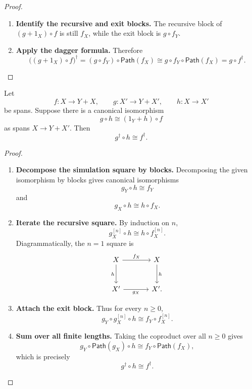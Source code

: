 \begin{proof}
\begin{enumerate}
  \item \textbf{Identify the recursive and exit blocks.}
  The recursive block of \((g+1_X)\circ f\) is still \(f_X\), while the exit
  block is \(g\circ f_Y\).

  \item \textbf{Apply the dagger formula.}
  Therefore
  \[
    \bigl((g+1_X)\circ f\bigr)^\dagger
    =
    (g\circ f_Y)\circ\mathsf{Path}(f_X)
    \cong
    g\circ f_Y\circ\mathsf{Path}(f_X)
    =
    g\circ f^\dagger.
  \]
\end{enumerate}
\end{proof}

\begin{theorem}[Uniformity]
\label{thm:conway-uniformity-feedback}
Let
\[
  f:X\to Y+X,
  \qquad
  g:X'\to Y+X',
  \qquad
  h:X\to X'
\]
be spans. Suppose there is a canonical isomorphism
\[
  g\circ h
  \cong
  (1_Y+h)\circ f
\]
as spans \(X\to Y+X'\). Then
\[
  g^\dagger\circ h
  \cong
  f^\dagger.
\]
\end{theorem}

\begin{proof}
\begin{enumerate}
  \item \textbf{Decompose the simulation square by blocks.}
  Decomposing the given isomorphism by blocks gives canonical isomorphisms
  \[
    g_Y\circ h\cong f_Y
  \]
  and
  \[
    g_X\circ h\cong h\circ f_X.
  \]

  \item \textbf{Iterate the recursive square.}
  By induction on \(n\),
  \[
    g_X^{[n]}\circ h
    \cong
    h\circ f_X^{[n]}.
  \]
  Diagrammatically, the \(n=1\) square is
  \[
  \begin{tikzcd}[column sep=large,row sep=large]
    X
      \ar[r,"f_X"]
      \ar[d,"h"']
    &
    X
      \ar[d,"h"]
    \\
    X'
      \ar[r,"g_X"']
    &
    X' .
  \end{tikzcd}
  \]

  \item \textbf{Attach the exit block.}
  Thus for every \(n\geq 0\),
  \[
    g_Y\circ g_X^{[n]}\circ h
    \cong
    f_Y\circ f_X^{[n]}.
  \]

  \item \textbf{Sum over all finite lengths.}
  Taking the coproduct over all \(n\geq 0\) gives
  \[
    g_Y\circ\mathsf{Path}(g_X)\circ h
    \cong
    f_Y\circ\mathsf{Path}(f_X),
  \]
  which is precisely
  \[
    g^\dagger\circ h
    \cong
    f^\dagger.
  \]
\end{enumerate}
\end{proof}

